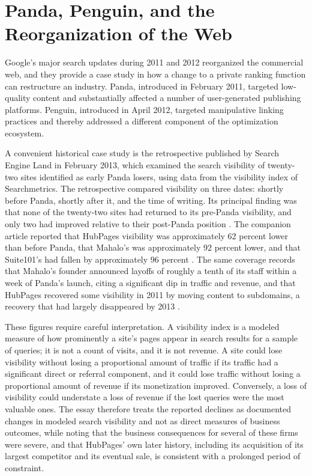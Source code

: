 \documentclass[11pt]{article}
\theoremstyle{remark}
\begin{document}
\section{Panda, Penguin, and the Reorganization of the Web}\label{sec:panda}

Google's major search updates during 2011 and 2012 reorganized the commercial web, and they provide a case study in how a change to a private ranking function can restructure an industry. Panda, introduced in February 2011, targeted low-quality content and substantially affected a number of user-generated publishing platforms. Penguin, introduced in April 2012, targeted manipulative linking practices and thereby addressed a different component of the optimization ecosystem.

A convenient historical case study is the retrospective published by Search Engine Land in February 2013, which examined the search visibility of twenty-two sites identified as early Panda losers, using data from the visibility index of Searchmetrics. The retrospective compared visibility on three dates: shortly before Panda, shortly after it, and the time of writing. Its principal finding was that none of the twenty-two sites had returned to its pre-Panda visibility, and only two had improved relative to their post-Panda position \cite{mcgee2013losers}. The companion article reported that HubPages visibility was approximately 62 percent lower than before Panda, that Mahalo's was approximately 92 percent lower, and that Suite101's had fallen by approximately 96 percent \cite{mcgee2013real,mcgee2013losers}. The same coverage records that Mahalo's founder announced layoffs of roughly a tenth of its staff within a week of Panda's launch, citing a significant dip in traffic and revenue, and that HubPages recovered some visibility in 2011 by moving content to subdomains, a recovery that had largely disappeared by 2013 \cite{mcgee2013real}.

These figures require careful interpretation. A visibility index is a modeled measure of how prominently a site's pages appear in search results for a sample of queries; it is not a count of visits, and it is not revenue. A site could lose visibility without losing a proportional amount of traffic if its traffic had a significant direct or referral component, and it could lose traffic without losing a proportional amount of revenue if its monetization improved. Conversely, a loss of visibility could understate a loss of revenue if the lost queries were the most valuable ones. The essay therefore treats the reported declines as documented changes in modeled search visibility and not as direct measures of business outcomes, while noting that the business consequences for several of these firms were severe, and that HubPages' own later history, including its acquisition of its largest competitor and its eventual sale, is consistent with a prolonged period of constraint.
\end{document}
